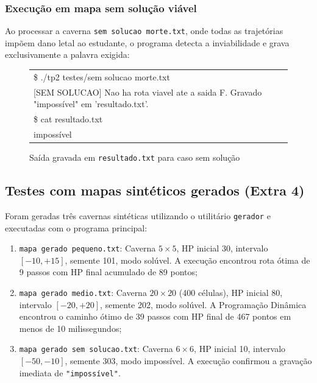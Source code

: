 \documentclass[12pt,a4paper]{article}
\makeatletter
\DeclareRobustCommand{\_}{%
  \ifmmode
    \nfss@text{\textunderscore}%
  \else
    \textunderscore\allowbreak
  \fi
}
\makeatother
\begin{document}
\subsubsection*{Execução em mapa sem solução viável}

Ao processar a caverna \texttt{sem\_solucao\_morte.txt}, onde todas as trajetórias impõem dano letal ao estudante, o programa detecta a inviabilidade e grava exclusivamente a palavra exigida:

\begin{figure}[htbp]
    \centering
    \begin{minipage}{0.85\textwidth}
        \ttfamily\small
        \begin{tabular}{|l|}
        \hline
        \$ ./tp2 testes/sem\_solucao\_morte.txt \\
        {[SEM SOLUCAO]} Nao ha rota viavel ate a saida F. Gravado "impossível" em 'resultado.txt'. \\[0.15cm]
        \$ cat resultado.txt \\
        impossível \\
        \hline
        \end{tabular}
    \end{minipage}
    \vspace{0.2cm}
    \caption{Saída gravada em \texttt{resultado.txt} para caso sem solução}
    \label{fig:exec_sem_solucao}
\end{figure}

\subsection{Testes com mapas sintéticos gerados (Extra 4)}

Foram geradas três cavernas sintéticas utilizando o utilitário \texttt{gerador} e executadas com o programa principal:
\begin{enumerate}
    \item \texttt{mapa\_gerado\_pequeno.txt}: Caverna $5 \times 5$, HP inicial 30, intervalo $[-10, +15]$, semente 101, modo solúvel. A execução encontrou rota ótima de 9 passos com HP final acumulado de 89 pontos;
    \item \texttt{mapa\_gerado\_medio.txt}: Caverna $20 \times 20$ (400 células), HP inicial 80, intervalo $[-20, +20]$, semente 202, modo solúvel. A Programação Dinâmica encontrou o caminho ótimo de 39 passos com HP final de 467 pontos em menos de 10 milissegundos;
    \item \texttt{mapa\_gerado\_sem\_solucao.txt}: Caverna $6 \times 6$, HP inicial 10, intervalo $[-50, -10]$, semente 303, modo impossível. A execução confirmou a gravação imediata de \texttt{"impossível"}.
\end{enumerate}
\end{document}
